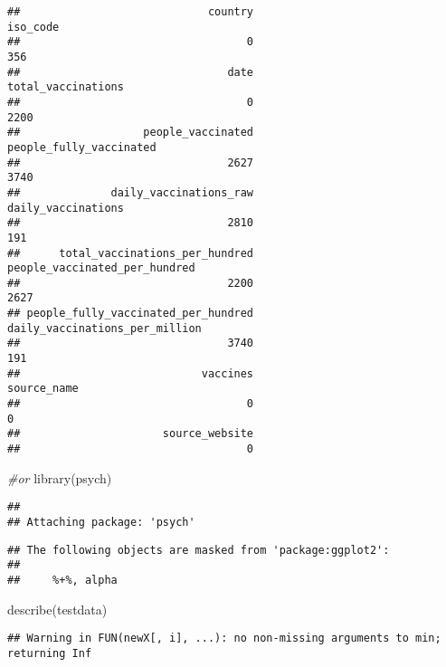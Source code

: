 \documentclass[
]{article}
\newenvironment{Shaded}{\begin{snugshade}}{\end{snugshade}}
\newcommand{\CommentTok}[1]{\textcolor[rgb]{0.56,0.35,0.01}{\textit{#1}}}
\newcommand{\FunctionTok}[1]{\textcolor[rgb]{0.00,0.00,0.00}{#1}}
\newcommand{\NormalTok}[1]{#1}
\begin{document}
\begin{verbatim}
##                             country                            iso_code 
##                                   0                                 356 
##                                date                  total_vaccinations 
##                                   0                                2200 
##                   people_vaccinated             people_fully_vaccinated 
##                                2627                                3740 
##              daily_vaccinations_raw                  daily_vaccinations 
##                                2810                                 191 
##      total_vaccinations_per_hundred       people_vaccinated_per_hundred 
##                                2200                                2627 
## people_fully_vaccinated_per_hundred      daily_vaccinations_per_million 
##                                3740                                 191 
##                            vaccines                         source_name 
##                                   0                                   0 
##                      source_website 
##                                   0
\end{verbatim}

\begin{Shaded}
\begin{Highlighting}[]
\CommentTok{\#or }
\FunctionTok{library}\NormalTok{(psych)}
\end{Highlighting}
\end{Shaded}

\begin{verbatim}
## 
## Attaching package: 'psych'
\end{verbatim}

\begin{verbatim}
## The following objects are masked from 'package:ggplot2':
## 
##     %+%, alpha
\end{verbatim}

\begin{Shaded}
\begin{Highlighting}[]
\FunctionTok{describe}\NormalTok{(testdata)}
\end{Highlighting}
\end{Shaded}

\begin{verbatim}
## Warning in FUN(newX[, i], ...): no non-missing arguments to min; returning Inf
\end{verbatim}
\end{document}
